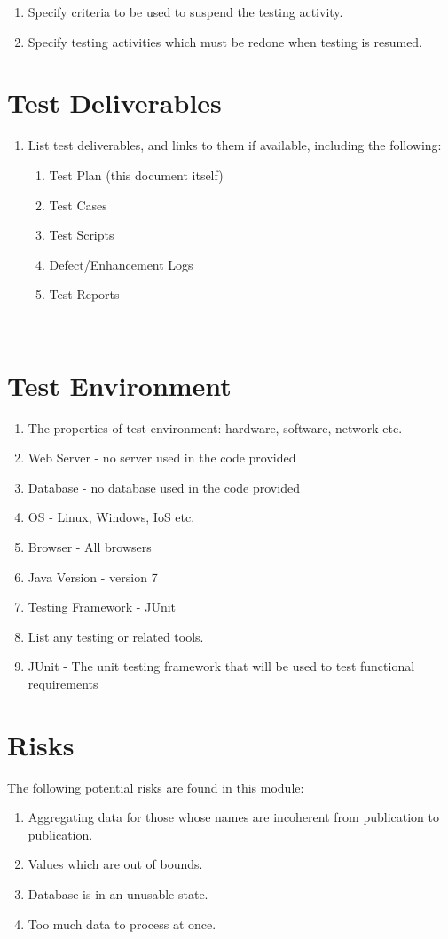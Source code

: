 \begin{enumerate}
	\item Specify criteria to be used to suspend the testing activity.
	\item Specify testing activities which must be redone when testing is resumed.
\end{enumerate}

\section{Test Deliverables}

\begin{enumerate}
	\item List test deliverables, and links to them if available, including the following:

\begin{enumerate}
	\item Test Plan (this document itself)
	\item Test Cases
	\item Test Scripts
	\item Defect/Enhancement Logs
	\item Test Reports
\end{enumerate}
\end{enumerate}
~
\section{Test Environment}

\begin{enumerate}
	\item The properties of test environment: hardware, software, network etc.
	\item Web Server - no server used in the code provided
	\item Database - no database used in the code provided
	\item OS - Linux, Windows, IoS etc.
	\item Browser - All browsers
	\item Java Version - version 7
	\item Testing Framework - JUnit
	\item List any testing or related tools.
	\item JUnit - The unit testing framework that will be used to test functional requirements
\end{enumerate}

\section{Risks}
	The following potential risks are found in this module:
\begin{enumerate}
	\item Aggregating data for those whose names are incoherent from publication to publication.
	\item Values  which are out of bounds.
	\item Database is in an unusable state.
	\item Too much data to process at once.
\end{enumerate}

